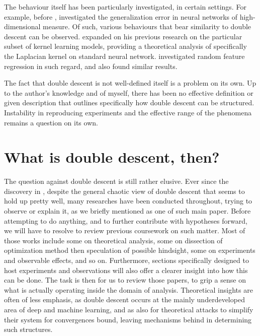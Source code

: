 The behaviour itself has been particularly investigated, in certain settings. For example, before \cite{belkin_reconciling_2019}, \cite{advani2017highdimensionaldynamicsgeneralizationerror} investigated the generalization error in neural networks of high-dimensional measure. Of such, various behaviours that bear similarity to double descent can be observed. \cite{belkin2018understanddeeplearningneed} expanded on his previous research on the particular subset of kernel learning models, providing a theoretical analysis of specifically the Laplacian kernel on standard neural network. \cite{mei2020generalizationerrorrandomfeatures} investigated random feature regression in such regard, and also found similar results. 

The fact that double descent is not well-defined itself is a problem on its own. Up to the author's knowledge and of myself, there has been no effective definition or given description that outlines specifically how double descent can be structured. Instability in reproducing experiments and the effective range of the phenomena remains a question on its own. 

\section{What is double descent, then?}


The question against double descent is still rather elusive. Ever since the discovery in \cite{belkin_reconciling_2019}, despite the general chaotic view of double descent that seems to hold up pretty well, many researches have been conducted throughout, trying to observe or explain it, as we briefly mentioned \cite{nakkiran_deep_2019} as one of such main paper. Before attempting to do anything, and to further contribute with hypotheses forward, we will have to resolve to review previous coursework on such matter. Most of those works include some on theoretical analysis, some on dissection of optimization method then speculation of possible hindsight, some on experiments and observable effects, and so on. Furthermore, sections specifically designed to host experiments and observations will also offer a clearer insight into how this can be done. The task is then for us to review those papers, to grip a sense on what is actually operating inside the domain of analysis. Theoretical insights are often of less emphasis, as double descent occurs at the mainly underdeveloped area of deep and machine learning, and as also for theoretical attacks to simplify their system for convergences bound, leaving mechanisms behind in determining such structures. 

